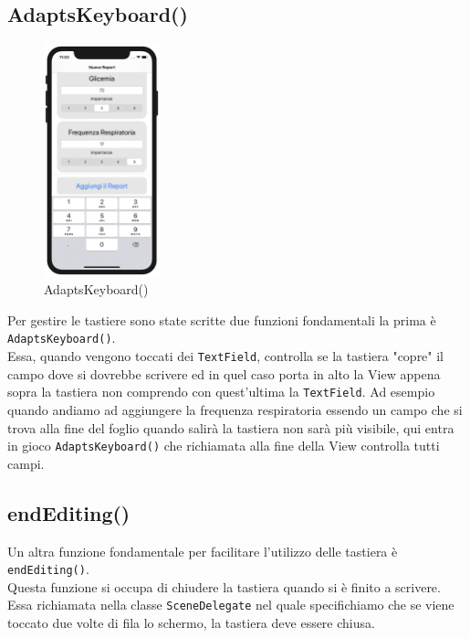 \documentclass{article}
\begin{document}
\subsection{AdaptsKeyboard()}
\begin{figure}
  \begin{center}
    \includegraphics[width=0.3\textwidth]{img/tastiera.png}
  \end{center}
\caption{AdaptsKeyboard()}
\end{figure}
Per gestire le tastiere sono state scritte due funzioni fondamentali la prima è \texttt{AdaptsKeyboard()}.\\
Essa, quando vengono toccati dei \texttt{TextField}, controlla se la tastiera "copre" il campo dove si dovrebbe scrivere ed in quel caso porta in alto la View appena sopra la tastiera non comprendo con quest'ultima la \texttt{TextField}. Ad esempio quando andiamo ad aggiungere la frequenza respiratoria essendo un campo che si trova alla fine del foglio quando salirà la tastiera non sarà più visibile, qui entra in gioco \texttt{AdaptsKeyboard()} che richiamata alla fine della View controlla tutti campi. 

\subsection{endEditing()}

Un altra funzione fondamentale per facilitare l'utilizzo delle tastiera è \texttt{endEditing()}.\\
Questa funzione si occupa di chiudere la tastiera quando si è finito a scrivere. Essa richiamata nella classe \texttt{SceneDelegate} nel quale specifichiamo che se viene toccato due volte di fila lo schermo, la tastiera deve essere chiusa. 
\end{document}
